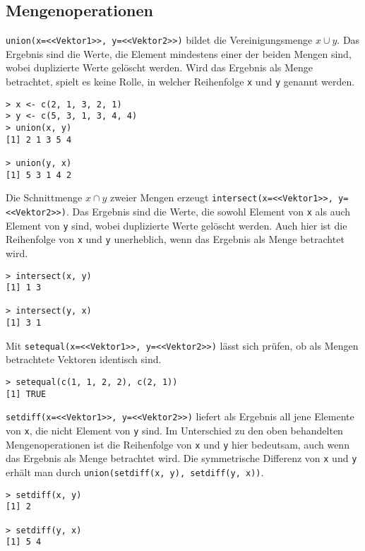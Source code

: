 \subsection{Mengenoperationen}
\label{sec:setOps}

\lstinline!union(x=<<Vektor1>>, y=<<Vektor2>>)! bildet die Vereinigungsmenge $x \cup y$. Das Ergebnis sind die Werte, die Element mindestens einer der beiden Mengen sind, wobei duplizierte Werte gelöscht werden. Wird das Ergebnis als Menge betrachtet, spielt es keine Rolle, in welcher Reihenfolge \lstinline!x! und \lstinline!y! genannt werden.
\begin{lstlisting}
> x <- c(2, 1, 3, 2, 1)
> y <- c(5, 3, 1, 3, 4, 4)
> union(x, y)
[1] 2 1 3 5 4

> union(y, x)
[1] 5 3 1 4 2
\end{lstlisting}

Die Schnittmenge $x \cap y$ zweier Mengen erzeugt \lstinline!intersect(x=<<Vektor1>>, y=<<Vektor2>>)!. Das Ergebnis sind die Werte, die sowohl Element von \lstinline!x! als auch Element von \lstinline!y! sind, wobei duplizierte Werte gelöscht werden. Auch hier ist die Reihenfolge von \lstinline!x! und \lstinline!y! unerheblich, wenn das Ergebnis als Menge betrachtet wird.
\begin{lstlisting}
> intersect(x, y)
[1] 1 3

> intersect(y, x)
[1] 3 1
\end{lstlisting}

Mit \lstinline!setequal(x=<<Vektor1>>, y=<<Vektor2>>)! lässt sich prüfen, ob als Mengen betrachtete Vektoren identisch sind.
\begin{lstlisting}
> setequal(c(1, 1, 2, 2), c(2, 1))
[1] TRUE
\end{lstlisting}

\lstinline!setdiff(x=<<Vektor1>>, y=<<Vektor2>>)! liefert als Ergebnis all jene Elemente von \lstinline!x!, die nicht Element von \lstinline!y! sind. Im Unterschied zu den oben behandelten Mengenoperationen ist die Reihenfolge von \lstinline!x! und \lstinline!y! hier bedeutsam, auch wenn das Ergebnis als Menge betrachtet wird. Die symmetrische Differenz von \lstinline!x! und \lstinline!y! erhält man durch \lstinline!union(setdiff(x, y), setdiff(y, x))!.
\begin{lstlisting}
> setdiff(x, y)
[1] 2

> setdiff(y, x)
[1] 5 4
\end{lstlisting}

